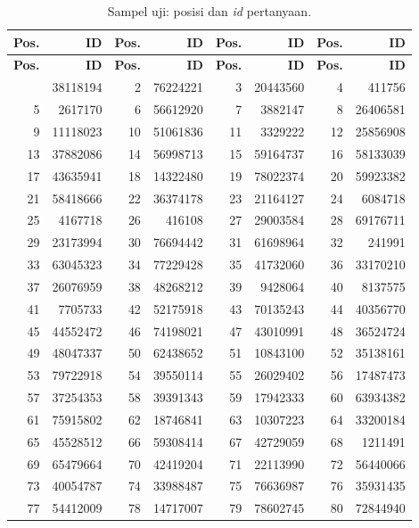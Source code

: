 \begin{longtable}{|r|r|r|r|r|r|r|r|}
\caption{Sampel uji: posisi dan \emph{id} pertanyaan.}\label{tab:lamp-id-uji}\\
\hline
\textbf{Pos.} & \textbf{ID} & \textbf{Pos.} & \textbf{ID} & \textbf{Pos.} & \textbf{ID} & \textbf{Pos.} & \textbf{ID} \\
\hline
\endfirsthead
\hline
\textbf{Pos.} & \textbf{ID} & \textbf{Pos.} & \textbf{ID} & \textbf{Pos.} & \textbf{ID} & \textbf{Pos.} & \textbf{ID} \\
\hline
\endhead
\hline
\endfoot
1 & 38118194 & 2 & 76224221 & 3 & 20443560 & 4 & 411756 \\
5 & 2617170 & 6 & 56612920 & 7 & 3882147 & 8 & 26406581 \\
9 & 11118023 & 10 & 51061836 & 11 & 3329222 & 12 & 25856908 \\
13 & 37882086 & 14 & 56998713 & 15 & 59164737 & 16 & 58133039 \\
17 & 43635941 & 18 & 14322480 & 19 & 78022374 & 20 & 59923382 \\
21 & 58418666 & 22 & 36374178 & 23 & 21164127 & 24 & 6084718 \\
25 & 4167718 & 26 & 416108 & 27 & 29003584 & 28 & 69176711 \\
29 & 23173994 & 30 & 76694442 & 31 & 61698964 & 32 & 241991 \\
33 & 63045323 & 34 & 77229428 & 35 & 41732060 & 36 & 33170210 \\
37 & 26076959 & 38 & 48268212 & 39 & 9428064 & 40 & 8137575 \\
41 & 7705733 & 42 & 52175918 & 43 & 70135243 & 44 & 40356770 \\
45 & 44552472 & 46 & 74198021 & 47 & 43010991 & 48 & 36524724 \\
49 & 48047337 & 50 & 62438652 & 51 & 10843100 & 52 & 35138161 \\
53 & 79722918 & 54 & 39550114 & 55 & 26029402 & 56 & 17487473 \\
57 & 37254353 & 58 & 39391343 & 59 & 17942333 & 60 & 63934382 \\
61 & 75915802 & 62 & 18746841 & 63 & 10307223 & 64 & 33200184 \\
65 & 45528512 & 66 & 59308414 & 67 & 42729059 & 68 & 1211491 \\
69 & 65479664 & 70 & 42419204 & 71 & 22113990 & 72 & 56440066 \\
73 & 40054787 & 74 & 33988487 & 75 & 76636987 & 76 & 35931435 \\
77 & 54412009 & 78 & 14717007 & 79 & 78602745 & 80 & 72844940 \\

\end{longtable}
